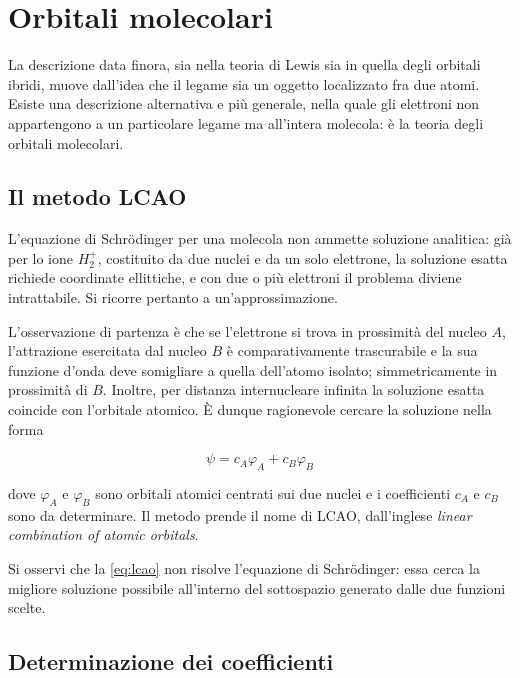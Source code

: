 \section{Orbitali molecolari}

La descrizione data finora, sia nella teoria di Lewis sia in quella degli orbitali ibridi, muove dall'idea che il legame sia un oggetto localizzato fra due atomi. Esiste una descrizione alternativa e più generale, nella quale gli elettroni non appartengono a un particolare legame ma all'intera molecola: è la teoria degli orbitali molecolari.

\subsection{Il metodo LCAO}

L'equazione di Schrödinger per una molecola non ammette soluzione analitica: già per lo ione $H_2^+$, costituito da due nuclei e da un solo elettrone, la soluzione esatta richiede coordinate ellittiche, e con due o più elettroni il problema diviene intrattabile. Si ricorre pertanto a un'approssimazione.

L'osservazione di partenza è che se l'elettrone si trova in prossimità del nucleo $A$, l'attrazione esercitata dal nucleo $B$ è comparativamente trascurabile e la sua funzione d'onda deve somigliare a quella dell'atomo isolato; simmetricamente in prossimità di $B$. Inoltre, per distanza internucleare infinita la soluzione esatta coincide con l'orbitale atomico. È dunque ragionevole cercare la soluzione nella forma

\begin{equation}
    \psi = c_A \varphi_A + c_B \varphi_B
    \label{eq:lcao}
\end{equation}

dove $\varphi_A$ e $\varphi_B$ sono orbitali atomici centrati sui due nuclei e i coefficienti $c_A$ e $c_B$ sono da determinare. Il metodo prende il nome di LCAO, dall'inglese \emph{linear combination of atomic orbitals}.

Si osservi che la \eqref{eq:lcao} non risolve l'equazione di Schrödinger: essa cerca la migliore soluzione possibile all'interno del sottospazio generato dalle due funzioni scelte.

\subsection{Determinazione dei coefficienti}

